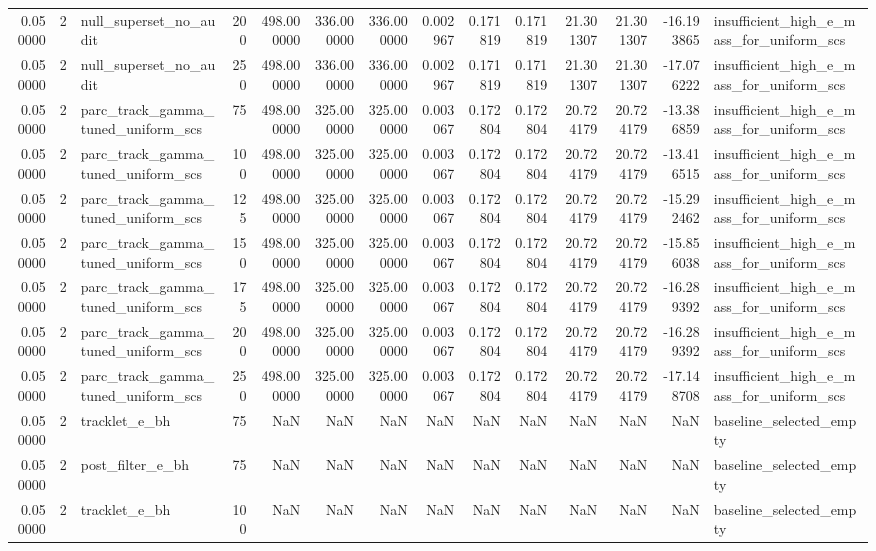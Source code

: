 \begin{tabular}{rrlrrrrrrrrrrl}
0.050000 & 2 & null_superset_no_audit & 200 & 498.000000 & 336.000000 & 336.000000 & 0.002967 & 0.171819 & 0.171819 & 21.301307 & 21.301307 & -16.193865 & insufficient_high_e_mass_for_uniform_scs \\
0.050000 & 2 & null_superset_no_audit & 250 & 498.000000 & 336.000000 & 336.000000 & 0.002967 & 0.171819 & 0.171819 & 21.301307 & 21.301307 & -17.076222 & insufficient_high_e_mass_for_uniform_scs \\
0.050000 & 2 & parc_track_gamma_tuned_uniform_scs & 75 & 498.000000 & 325.000000 & 325.000000 & 0.003067 & 0.172804 & 0.172804 & 20.724179 & 20.724179 & -13.386859 & insufficient_high_e_mass_for_uniform_scs \\
0.050000 & 2 & parc_track_gamma_tuned_uniform_scs & 100 & 498.000000 & 325.000000 & 325.000000 & 0.003067 & 0.172804 & 0.172804 & 20.724179 & 20.724179 & -13.416515 & insufficient_high_e_mass_for_uniform_scs \\
0.050000 & 2 & parc_track_gamma_tuned_uniform_scs & 125 & 498.000000 & 325.000000 & 325.000000 & 0.003067 & 0.172804 & 0.172804 & 20.724179 & 20.724179 & -15.292462 & insufficient_high_e_mass_for_uniform_scs \\
0.050000 & 2 & parc_track_gamma_tuned_uniform_scs & 150 & 498.000000 & 325.000000 & 325.000000 & 0.003067 & 0.172804 & 0.172804 & 20.724179 & 20.724179 & -15.856038 & insufficient_high_e_mass_for_uniform_scs \\
0.050000 & 2 & parc_track_gamma_tuned_uniform_scs & 175 & 498.000000 & 325.000000 & 325.000000 & 0.003067 & 0.172804 & 0.172804 & 20.724179 & 20.724179 & -16.289392 & insufficient_high_e_mass_for_uniform_scs \\
0.050000 & 2 & parc_track_gamma_tuned_uniform_scs & 200 & 498.000000 & 325.000000 & 325.000000 & 0.003067 & 0.172804 & 0.172804 & 20.724179 & 20.724179 & -16.289392 & insufficient_high_e_mass_for_uniform_scs \\
0.050000 & 2 & parc_track_gamma_tuned_uniform_scs & 250 & 498.000000 & 325.000000 & 325.000000 & 0.003067 & 0.172804 & 0.172804 & 20.724179 & 20.724179 & -17.148708 & insufficient_high_e_mass_for_uniform_scs \\
0.050000 & 2 & tracklet_e_bh & 75 & NaN & NaN & NaN & NaN & NaN & NaN & NaN & NaN & NaN & baseline_selected_empty \\
0.050000 & 2 & post_filter_e_bh & 75 & NaN & NaN & NaN & NaN & NaN & NaN & NaN & NaN & NaN & baseline_selected_empty \\
0.050000 & 2 & tracklet_e_bh & 100 & NaN & NaN & NaN & NaN & NaN & NaN & NaN & NaN & NaN & baseline_selected_empty \\

\end{tabular}
